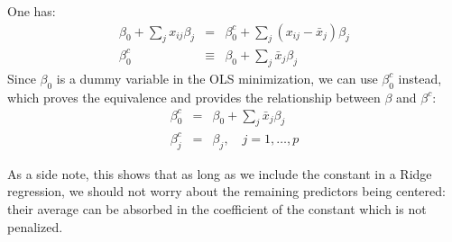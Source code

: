 

One has:
\begin{eqnarray*}
    \beta_0 + \sum_j x_{ij} \beta_j & = & \beta_0^c + \sum_j (x_{ij} - \bar{x}_j) \beta_j \\
    \beta_0^c & \equiv & \beta_0 + \sum_j \bar{x}_j \beta_j
\end{eqnarray*}
Since $\beta_0$ is a dummy variable in the OLS minimization, we can use $\beta_0^c$ instead,
which proves the equivalence and provides the relationship between $\beta$ and $\beta^c$:
\begin{eqnarray*}
    \beta_0^c & = & \beta_0 + \sum_j \bar{x}_j \beta_j \\
    \beta_j^c & = & \beta_j, \quad j = 1, \ldots, p
\end{eqnarray*}

As a side note, this shows that as long as we include the constant in a Ridge regression,
we should not worry about the remaining predictors being centered: their average
can be absorbed in the coefficient of the constant which is not penalized.